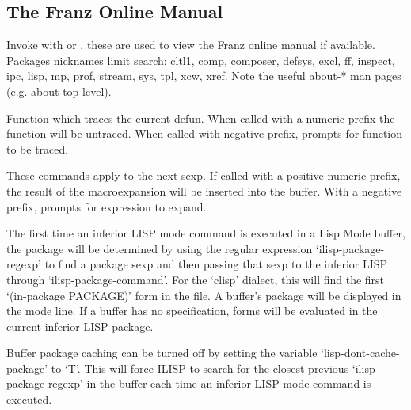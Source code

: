 

\subsection{The Franz Online Manual}

Invoke with  or , these are used to view the 
Franz online manual if available.  Packages
nicknames limit search: cltl1, comp, composer, defsys, excl, ff, inspect,
ipc, lisp, mp, prof, stream, sys, tpl, xcw, xref.  Note the useful about-*
man pages (e.g. about-top-level).



Function which traces the current defun. When called with a numeric prefix the 
function will be untraced. When called with negative prefix, prompts for function to be traced.



 These commands apply to the next sexp.  If called with a positive
 numeric prefix, the result of the macroexpansion will be inserted
 into the buffer.  With a negative prefix, prompts for expression
 to expand.




The first time an inferior LISP mode command is executed in a Lisp
Mode buffer, the package will be determined by using the regular
expression `ilisp-package-regexp' to find a package sexp and then
passing that sexp to the inferior LISP through `ilisp-package-command'.
For the `clisp' dialect, this will find the first `(in-package
PACKAGE)' form in the file.  A buffer's package will be displayed in
the mode line.  If a buffer has no specification, forms will be
evaluated in the current inferior LISP package.

Buffer package caching can be turned off by setting the variable
`lisp-dont-cache-package' to `T'. This will force ILISP to search for
the closest previous `ilisp-package-regexp' in the buffer each time an
inferior LISP mode command is executed.

